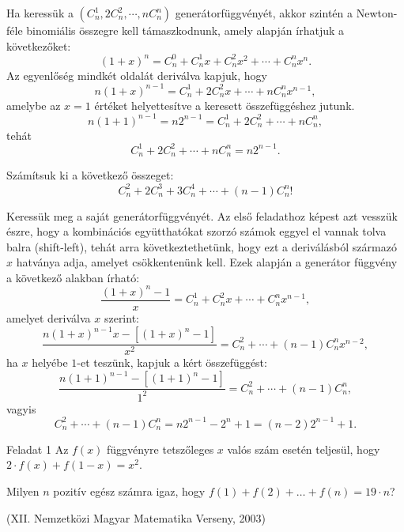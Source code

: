 \begin{solution}
Ha keressük a $(C_{n}^{1},2C_{n}^{2},\cdots,nC_{n}^{n})$ generátorfüggvényét,
akkor szintén a Newton-féle binomiális összegre kell támaszkodnunk,
amely alapján írhatjuk a következőket: 
\[
(1+x)^{n}=C_{n}^{0}+C_{n}^{1}x+C_{n}^{2}x^{2}+\cdots+C_{n}^{n}x^{n}.
\]
Az egyenlőség mindkét oldalát deriválva kapjuk, hogy 
\[
n(1+x)^{n-1}=C_{n}^{1}+2C_{n}^{2}x+\cdots+nC_{n}^{n}x^{n-1},
\]
amelybe az $x=1$ értéket helyettesítve a keresett összefüggéshez
jutunk. 
\[
n(1+1)^{n-1}=n2^{n-1}=C_{n}^{1}+2C_{n}^{2}+\cdots+nC_{n}^{n},
\]
tehát 
\[
C_{n}^{1}+2C_{n}^{2}+\cdots+nC_{n}^{n}=n2^{n-1}.
\]
\end{solution}
\begin{extraproblem}
Számítsuk ki a következő összeget: 
\[
C_{n}^{2}+2C_{n}^{3}+3C_{n}^{4}+\cdots+(n-1)C_{n}^{n}!
\]
\end{extraproblem}

\begin{solution}
Keressük meg a saját generátorfüggvényét. Az első feladathoz képest
azt vesszük észre, hogy a kombinációs együtthatókat szorzó számok
eggyel el vannak tolva balra (shift-left), tehát arra következtethetünk,
hogy ezt a deriválásból származó $x$ hatványa adja, amelyet csökkentenünk
kell. Ezek alapján a generátor függvény a következő alakban írható:
\[
\frac{(1+x)^{n}-1}{x}=C_{n}^{1}+C_{n}^{2}x+\cdots+C_{n}^{n}x^{n-1},
\]
amelyet deriválva $x$ szerint: 
\[
\frac{n(1+x)^{n-1}x-[(1+x)^{n}-1]}{x^{2}}=C_{n}^{2}+\cdots+(n-1)C_{n}^{n}x^{n-2},
\]
ha $x$ helyébe $1$-et teszünk, kapjuk a kért összefüggést: 
\[
\frac{n(1+1)^{n-1}-[(1+1)^{n}-1]}{1^{2}}=C_{n}^{2}+\cdots+(n-1)C_{n}^{n},
\]
vagyis 
\[
C_{n}^{2}+\cdots+(n-1)C_{n}^{n}=n2^{n-1}-2^{n}+1=(n-2)2^{n-1}+1.
\]
\end{solution}
\begin{extraproblem}
Feladat 1 Az $f(x)$ függvényre tetszőleges $x$ valós szám esetén
teljesül, hogy $2\cdot f(x)+f(1-x)=x^{2}$.

Milyen $n$ pozitív egész számra igaz, hogy $f(1)+f(2)+\dots+f(n)=19\cdot n$?

(XII. Nemzetközi Magyar Matematika Verseny, 2003) 
\end{extraproblem}

